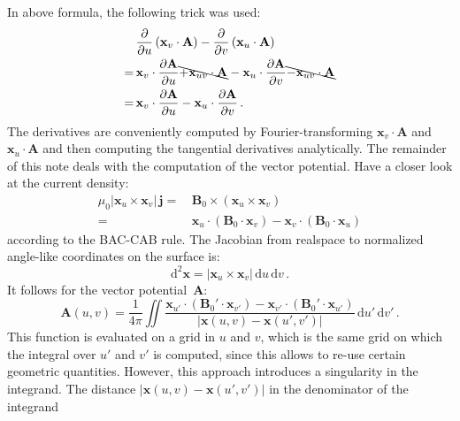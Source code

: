 In above formula, the following trick was used:
\begin{align}
 ~&\,   \frac{\partial}{\partial u} \left(\mathbf{x}_v \cdot \mathbf{A} \right)
      - \frac{\partial}{\partial v} \left(\mathbf{x}_u \cdot \mathbf{A} \right) \nonumber \\
 =&\,   \mathbf{x}_v \cdot \frac{\partial \mathbf{A}}{\partial u} \bcancel{+ \mathbf{x}_{uv} \cdot \mathbf{A}}
      - \mathbf{x}_u \cdot \frac{\partial \mathbf{A}}{\partial v} \bcancel{- \mathbf{x}_{uv} \cdot \mathbf{A}} \nonumber \\
 =&\,   \mathbf{x}_v \cdot \frac{\partial \mathbf{A}}{\partial u}
      - \mathbf{x}_u \cdot \frac{\partial \mathbf{A}}{\partial v} \, .
\end{align}
The derivatives are conveniently computed by Fourier-transforming
$\mathbf{x}_v \cdot \mathbf{A}$ and $\mathbf{x}_u \cdot \mathbf{A}$
and then computing the tangential derivatives analytically.
The remainder of this note deals with the computation of the vector potential.
Have a closer look at the current density:
\begin{align}
 \mu_0 |\mathbf{x}_u \times \mathbf{x}_v| \,\mathbf{j}
 =&\, \mathbf{B}_0 \times \left( \mathbf{x}_u \times \mathbf{x}_v \right) \nonumber \\
 =&\,   \mathbf{x}_u \cdot \left( \mathbf{B}_0 \cdot \mathbf{x}_v \right)
      - \mathbf{x}_v \cdot \left( \mathbf{B}_0 \cdot \mathbf{x}_u \right)
\end{align}
according to the BAC-CAB rule.
The Jacobian from realspace to normalized angle-like coordinates on the surface is:
\begin{equation}
 \mathrm{d}^2\mathbf{x} = |\mathbf{x}_u \times \mathbf{x}_v| \,\mathrm{d}u \,\mathrm{d}v \, .
\end{equation}
It follows for the vector potential~$\mathbf{A}$:
\begin{equation}
 \mathbf{A}(u, v) = \frac{1}{4 \pi} \iint
    \frac{  \mathbf{x}_{u'} \cdot \left( \mathbf{B}_0' \cdot \mathbf{x}_{v'} \right)
          - \mathbf{x}_{v'} \cdot \left( \mathbf{B}_0' \cdot \mathbf{x}_{u'} \right) }
         {|\mathbf{x}(u,v) - \mathbf{x}(u',v')|}
    \,\mathrm{d}u' \,\mathrm{d}v' \, .
\end{equation}
This function is evaluated on a grid in $u$ and $v$,
which is the same grid on which the integral over $u'$ and $v'$ is computed,
since this allows to re-use certain geometric quantities.
However, this approach introduces a singularity in the integrand.
The distance $|\mathbf{x}(u,v) - \mathbf{x}(u',v')|$ in the denominator of the integrand
